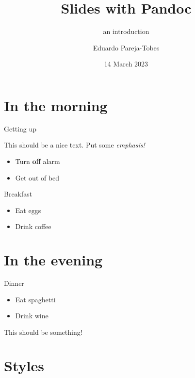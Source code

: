 \documentclass[10pt,compress]{beamer}
\title{Slides with Pandoc}
\subtitle{an introduction}
\author{Eduardo Pareja-Tobes}
\date{14 March 2023}
\institute{
  \href{http://era7bioinformatics.com}{{Era7} {\color{Grey-Light}bioinformatics}} - {\color{Salmon-Dark}oh}{\color{LightAmber-Dark}no}{\color{Grey}sequences}{\color{Salmon-Dark}!}
}
\begin{document}
\maketitle


% 
\section{In the morning}\label{in-the-morning}

\begin{frame}{Getting up}

This should be a nice text. Put some \emph{emphasis!}

\begin{itemize}
\itemsep1pt\parskip0pt
\item
  Turn \textbf{off} alarm
\item
  Get out of bed
\end{itemize}

\end{frame}

\begin{frame}{Breakfast}

\begin{itemize}
\itemsep1pt\parskip0pt
\item
  Eat eggs
\item
  Drink coffee
\end{itemize}

\end{frame}

\section{In the evening}\label{in-the-evening}

\begin{frame}{Dinner}

\begin{itemize}
\itemsep1pt\parskip0pt
\item
  Eat spaghetti
\item
  Drink wine
\end{itemize}

This should be something!

\end{frame}

\section{Styles}\label{styles}
\end{document}
